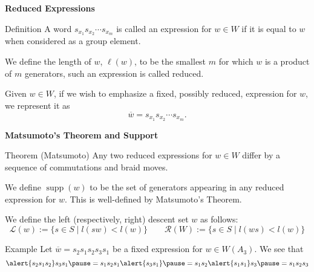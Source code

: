 \documentclass{beamer}
\newcommand{\w}{\overline{w}}
\DeclareMathOperator{\supp}{supp}
\newcommand{\RD}{\mathcal{R}}
\begin{document}
\begin{frame}{\textbf{Reduced Expressions}}

\begin{block}{Definition}
A word $s_{x_1}s_{x_2}\cdots s_{x_m}$ is called an \alert
{expression} for $w\in W$ if it is equal to $w$ when considered as 
a group element.

\vspace{1em}
\pause

We define the \alert{length} of $w$, $\ell(w)$, to be the smallest $m$ for which $w$ is a product of $m$ generators, such an expression is called \alert{reduced}.

\vspace{1em}
\pause

Given $w \in W$, if we wish to emphasize a fixed, possibly reduced, 
expression for $w$, we represent it as
\[
\w=s_{x_1}s_{x_2}\cdots s_{x_m}.
\]
\end{block}

\end{frame}


\begin{frame}{\textbf{Matsumoto's Theorem and Support}}
\begin{block}{Theorem (Matsumoto)}
Any two reduced expressions for $w\in W$ differ by a sequence of commutations and braid moves.
\end{block}	

\pause

\begin{definition}
	We define $\supp(w)$ to be the set of generators appearing in any reduced expression for $w$. This is well-defined by Matsumoto's Theorem.
\end{definition}

\pause

\begin{definition}
 We define the \alert{left} (respectively, \alert{right}) \alert{descent set}  $w$ as follows:
\[\mathcal{L}(w):=\{s \in S \mid l(sw) < l(w)\} \qquad \RD(W):=\{s \in S \mid l(ws)< l(w)\}\]
\end{definition}

\pause

\begin{block}{Example}
Let $\w=s_2s_1s_2s_3s_1$ be a fixed expression for $w \in W(A_3)$. We see that
\[\alert{s_2s_1s_2}s_3s_1 \pause =s_1s_2s_1\alert{s_3s_1} \pause =s_1s_2\alert{s_1s_1}s_3\pause=s_1s_2s_3\]	
\end{block}

\end{frame}
\end{document}
